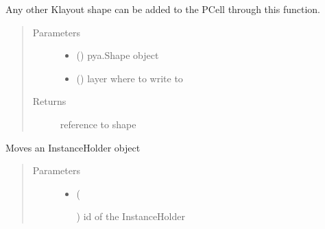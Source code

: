 \documentclass[a4paper,10pt,english]{sphinxmanual}
\begin{document}
\begin{fulllineitems}
\begin{fulllineitems}
\end{fulllineitems}


\begin{fulllineitems}
\label{\detokenize{photonics:photonics.PhotDevice.insert_shape}}
Any other Klayout shape can be added to the PCell through this function.
\begin{quote}\begin{description}
\item[{Parameters}] \leavevmode\begin{itemize}
\item {} 
 () \textendash{} pya.Shape object

\item {} 
 () \textendash{} layer where to write to

\end{itemize}

\item[{Returns}] \leavevmode
reference to shape

\end{description}\end{quote}

\end{fulllineitems}


\begin{fulllineitems}
\label{\detokenize{photonics:photonics.PhotDevice.move_instance}}
Moves an InstanceHolder object
\begin{quote}\begin{description}
\item[{Parameters}] \leavevmode\begin{itemize}
\item {} 
 (%
\begin{footnote}[58]\sphinxAtStartFootnote
{}
%
\end{footnote}) \textendash{} id of the InstanceHolder


\end{itemize}
\end{description}
\end{quote}
\end{fulllineitems}
\end{fulllineitems}
\end{document}
